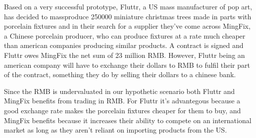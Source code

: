 \documentclass[11pt]{article}
\begin{document}
Based on a very successful prototype, Fluttr, a US mass manufacturer of pop art,  has decided to massproduce 
250000 miniature christmas trees made in parts with porcelain fixtures 
and in their search for a supplier they've come across MingFix, a Chinese porcelain producer,  who can 
produce fixtures at a rate much cheaper than american companies 
producing similar products. A contract is signed and Fluttr owes 
MingFix the net sum of 23 million RMB. However, Fluttr being an american 
company will have to exchange their dollars to RMB to fulfil their part 
of the contract, something they do by selling their dollars to a chinese 
bank.


Since the RMB is undervaluated in our hypothetic scenario both Fluttr 
and MingFix benefits from trading in RMB. For Fluttr it's advantegous 
because a good exchange rate makes the porcelain fixtures cheaper for 
them to buy, and MingFix benefits because it increases their ability to 
compete on an international market as long as they aren't reliant on 
importing products from the US.

\end{document}
